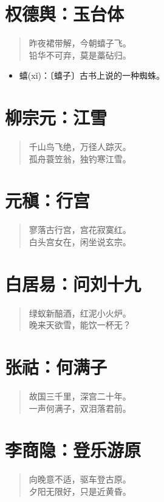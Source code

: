 \documentclass[12pt,oneside]{book}
\newenvironment{shici}{
\begin{verse}
\centering\large\hspace{12pt}}
{\end{verse}}
\begin{document}
\chapter{权德舆：玉台体}
\begin{shici}
昨夜裙带解，今朝蟢子飞。\\
铅华不可弃，莫是藁砧归。
\end{shici}

\begin{itemize}
\item 蟢(xǐ)：〔蟢子〕古书上说的一种蜘蛛。
\end{itemize}


\chapter{柳宗元：江雪}
\begin{shici}
千山鸟飞绝，万径人踪灭。\\
孤舟蓑笠翁，独钓寒江雪。
\end{shici}

\chapter{元稹：行宫}
\begin{shici}
寥落古行宫，宫花寂寞红。\\
白头宫女在，闲坐说玄宗。
\end{shici}

\chapter{白居易：问刘十九}
\begin{shici}
绿蚁新醅酒，红泥小火炉。\\
晚来天欲雪，能饮一杯无？
\end{shici}

\chapter{张祜：何满子}
\begin{shici}
故国三千里，深宫二十年。\\
一声何满子，双泪落君前。
\end{shici}

\chapter{李商隐：登乐游原}
\begin{shici}
向晚意不适，驱车登古原。\\
夕阳无限好，只是近黄昏。
\end{shici}
\end{document}
